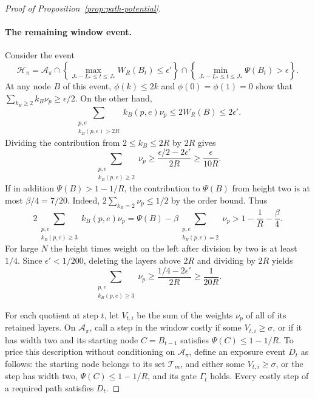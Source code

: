 \begin{proof}[Proof of Proposition~\ref{prop:path-potential}]
\paragraph{The remaining window event.}
Consider the event
\[
 \mathcal H_\pi=\mathcal A_\pi
  \cap\left\{\max_{J_*-L_*\le t\le J_*}W_R(B_t)\le\epsilon'\right\}
  \cap\left\{\min_{J_*-L_*\le t\le J_*}\Psi(B_t)>\epsilon\right\}.
\]
At any node \(B\) of this event, \(\phi(k)\le2k\) and
\(\phi(0)=\phi(1)=0\) show that
\(\sum_{k_B\ge2}k_B\nu_p\ge\epsilon/2\). On the other hand,
\[
 \sum_{\substack{p,e\\ k_B(p,e)>2R}}k_B(p,e)\nu_p
 \le2W_R(B)\le2\epsilon'.
\]
Dividing the contribution from \(2\le k_B\le2R\) by \(2R\) gives
\begin{equation}\label{eq:path-window-two}
 \sum_{\substack{p,e\\k_B(p,e)\ge2}}\nu_p
 \ge\frac{\epsilon/2-2\epsilon'}{2R}
 \ge\frac{\epsilon}{10R}.
\end{equation}
If in addition \(\Psi(B)>1-1/R\), the contribution to \(\Psi(B)\)
from height two is at most \(\beta/4=7/20\). Indeed,
\(2\sum_{k_B=2}\nu_p\le1/2\) by the order bound. Thus
\[
 2\sum_{\substack{p,e\\k_B(p,e)\ge3}}k_B(p,e)\nu_p
  =\Psi(B)-\beta\sum_{\substack{p,e\\k_B(p,e)=2}}\nu_p
  >1-\frac1R-\frac{\beta}{4}.
\]
For large \(N\) the height times weight on the left after division by
two is at least \(1/4\). Since \(\epsilon'<1/200\), deleting the
layers above \(2R\) and dividing by \(2R\) yields
\begin{equation}\label{eq:path-window-three}
 \sum_{\substack{p,e\\k_B(p,e)\ge3}}\nu_p
 \ge\frac{1/4-2\epsilon'}{2R}\ge\frac1{20R}.
\end{equation}

For each quotient at step \(t\), let \(V_{t,i}\) be the sum of the
weights \(\nu_p\) of all of its retained layers. On
\(\mathcal A_\pi\), call a step in the window costly if some
\(V_{t,i}\ge\sigma\), or if it has width two and its starting node
\(C=B_{t-1}\) satisfies \(\Psi(C)\le1-1/R\). To price this
description without conditioning on \(\mathcal A_\pi\), define an
exposure event \(D_t\) as follows: the starting node belongs to its
set \(\mathcal T_m\), and either some \(V_{t,i}\ge\sigma\), or the
step has width two, \(\Psi(C)\le1-1/R\), and its gate \(\Gamma_t\)
holds. Every costly step of a required path satisfies \(D_t\).


\end{proof}
